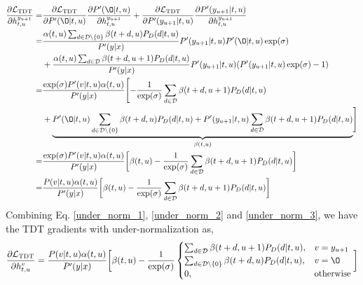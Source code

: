\documentclass{article}
\begin{document}
\begin{equation} \label{under_norm_3}
\begin{aligned}
 \frac{\partial{\mathcal{L}_\text{TDT}}}{\partial{h_{t, u}^{y_{u+1}}}} = & \frac{\partial{\mathcal{L}_\text{TDT}}}{\partial{P'(\O| t, u)}} \frac{\partial{P'(\O| t, u)}}{\partial{h_{t, u}^{y_{u+1}}}} + \frac{\partial{\mathcal{L}_\text{TDT}}}{\partial{P'(y_{u+1}| t, u)}} \frac{\partial{P'(y_{u+1}| t, u)}}{\partial{h_{t, u}^{y_{u+1}}}} \\
=  & \frac{\alpha(t, u) \sum_{d \in \mathcal{D} \setminus \{0\}} {\beta(t + d,u) P_D(d|t, u)}} {P'(y|x)} P'(y_{u+1}| t, u)P'(\O| t, u) \exp(\sigma)\\
 & + \frac{\alpha(t, u) \sum_{d \in \mathcal{D}}                 {\beta(t + d,u+1)P_D(d|t,u)}} {P'(y|x)} P'(y_{u+1}| t, u) (P'(y_{u+1}|t, u) \exp(\sigma) - 1) \\
 = & \frac{\exp(\sigma) P'(v|t, u) \alpha(t, u)}{P'(y|x)} \Biggl[ - \frac{1}{\exp(\sigma)} \sum_{d \in \mathcal{D} } {\beta(t + d,u+1) P_D(d|t, u)}\\
 & + \underbrace{ P'(\O|t, u)  \sum_{d \in \mathcal{D} \setminus \{0\}} {\beta(t + d,u) P_D(d|t, u)} + P'(y_{u+1}|t, u)  \sum_{d \in \mathcal{D}}                 {\beta(t + d,u+1)P_D(d|t,u)} }_{\beta(t,u)}  \Biggr] \\
 = & \frac{\exp(\sigma) P'(v|t, u) \alpha(t, u) }{P'(y|x)} \bigg[ \beta(t,u) -\frac{1}{\exp(\sigma)}  \sum_{d \in \mathcal{D} } {\beta(t + d,u+1) P_D(d|t, u)} \bigg] \\
 = & \frac{P(v|t, u) \alpha(t, u)}{P'(y|x)} \bigg[ \beta(t,u) - \frac{1}{\exp(\sigma)}  \sum_{d \in \mathcal{D}} {\beta(t + d,u+1) P_D(d|t, u)} \bigg] \\
\end{aligned}
\end{equation}
Combining Eq. \ref{under_norm_1}, \ref{under_norm_2} and \ref{under_norm_3}, we have the TDT gradients with under-normalization as,
\begin{equation}
\frac{\partial{\mathcal{L}_\text{TDT}}}{\partial{h_{t, u}^{v}}} =  \frac{P(v|t, u) \alpha(t, u)}{P'(y|x)} \bigg[ \beta(t,u) - \frac{1}{\exp(\sigma)} \begin{cases}
 \sum_{d \in \mathcal{D}} {\beta(t + d,u+1) P_D(d|t, u)}, & v = y_{u+1} \\
 \sum_{d \in \mathcal{D}\setminus \{0\}} {\beta(t + d,u) P_D(d|t, u)}, & v = \O \\
0, & \text{otherwise} 
\end{cases}
\bigg]
\end{equation}
\end{document}

